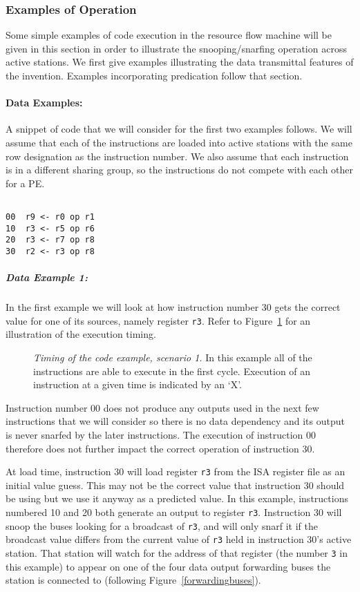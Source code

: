 \documentclass[10pt,dvips]{article}
\begin{document}
\subsubsection{Examples of Operation}
Some simple examples of code execution in the resource flow machine
will be 
given in this section in order to illustrate the snooping/snarfing
operation across active stations. We first give examples illustrating
the data transmittal features of the invention. Examples incorporating
predication follow that section.

\paragraph{Data Examples: }
A snippet of code that we will consider for the first two examples
follows. We will assume that each of the
instructions are loaded into active stations with the same row designation
as the instruction number. We also assume that each instruction is in
a different sharing group, so the instructions do not compete with
each other for a PE.

\begin{verbatim}

00	r9 <- r0 op r1
10	r3 <- r5 op r6
20	r3 <- r7 op r8
30	r2 <- r3 op r8

\end{verbatim}

\subparagraph{Data Example 1: }
In the first example we will look at how instruction number 30 gets the
correct value for one of its sources, namely register
{\tt r3}. Refer to Figure~\ref{ex1} for an illustration of the execution
timing.

\begin{figure}
\centering
{}
\caption{{\em Timing of the code example, scenario 1.}
In this example all of the instructions are able to execute in
the first cycle. Execution of an instruction at a given time is
indicated by an `X'.}
\label{ex1}
\end{figure}

Instruction number 00 does not produce
any outputs used in the next few instructions that
we will consider so there is no data dependency and its output 
is never snarfed by the later instructions.
The execution of instruction 00 therefore
does not further impact the correct operation of instruction 30.

At load time, instruction 30 will
load register
{\tt r3}
from the ISA register file as an initial value guess.  
This may not be
the correct value that instruction 30 should be using but 
we use it anyway as a predicted value.
In this example, instructions numbered 10 and 20 both generate
an output to register 
{\tt r3}.
Instruction 30 will snoop the buses looking for a broadcast of
{\tt r3}, and will only snarf it if the broadcast value differs from
the current value of {\tt r3} held in instruction 30's active
station.
That station will watch for the address
of that register (the number {\tt 3} in this example) to
appear on one of the four data output forwarding buses the station is
connected to (following Figure~\ref{forwardingbuses}).
\end{document}
